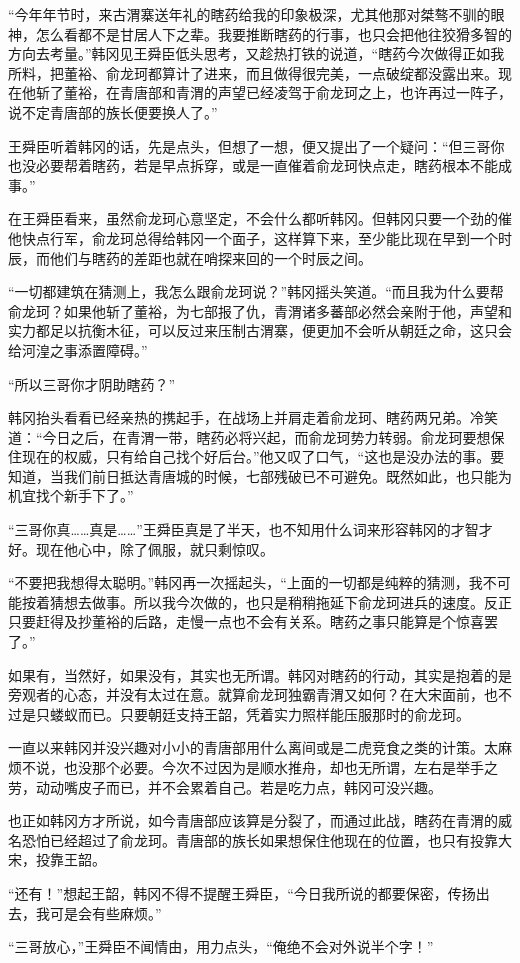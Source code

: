 “今年年节时，来古渭寨送年礼的瞎药给我的印象极深，尤其他那对桀骜不驯的眼神，怎么看都不是甘居人下之辈。我要推断瞎药的行事，也只会把他往狡猾多智的方向去考量。”韩冈见王舜臣低头思考，又趁热打铁的说道，“瞎药今次做得正如我所料，把董裕、俞龙珂都算计了进来，而且做得很完美，一点破绽都没露出来。现在他斩了董裕，在青唐部和青渭的声望已经凌驾于俞龙珂之上，也许再过一阵子，说不定青唐部的族长便要换人了。”

王舜臣听着韩冈的话，先是点头，但想了一想，便又提出了一个疑问：“但三哥你也没必要帮着瞎药，若是早点拆穿，或是一直催着俞龙珂快点走，瞎药根本不能成事。”

在王舜臣看来，虽然俞龙珂心意坚定，不会什么都听韩冈。但韩冈只要一个劲的催他快点行军，俞龙珂总得给韩冈一个面子，这样算下来，至少能比现在早到一个时辰，而他们与瞎药的差距也就在哨探来回的一个时辰之间。

“一切都建筑在猜测上，我怎么跟俞龙珂说？”韩冈摇头笑道。“而且我为什么要帮俞龙珂？如果他斩了董裕，为七部报了仇，青渭诸多蕃部必然会亲附于他，声望和实力都足以抗衡木征，可以反过来压制古渭寨，便更加不会听从朝廷之命，这只会给河湟之事添置障碍。”

“所以三哥你才阴助瞎药？”

韩冈抬头看看已经亲热的携起手，在战场上并肩走着俞龙珂、瞎药两兄弟。冷笑道：“今日之后，在青渭一带，瞎药必将兴起，而俞龙珂势力转弱。俞龙珂要想保住现在的权威，只有给自己找个好后台。”他又叹了口气，“这也是没办法的事。要知道，当我们前日抵达青唐城的时候，七部残破已不可避免。既然如此，也只能为机宜找个新手下了。”

“三哥你真……真是……”王舜臣真是了半天，也不知用什么词来形容韩冈的才智才好。现在他心中，除了佩服，就只剩惊叹。

“不要把我想得太聪明。”韩冈再一次摇起头，“上面的一切都是纯粹的猜测，我不可能按着猜想去做事。所以我今次做的，也只是稍稍拖延下俞龙珂进兵的速度。反正只要赶得及抄董裕的后路，走慢一点也不会有关系。瞎药之事只能算是个惊喜罢了。”

如果有，当然好，如果没有，其实也无所谓。韩冈对瞎药的行动，其实是抱着的是旁观者的心态，并没有太过在意。就算俞龙珂独霸青渭又如何？在大宋面前，也不过是只蝼蚁而已。只要朝廷支持王韶，凭着实力照样能压服那时的俞龙珂。

一直以来韩冈并没兴趣对小小的青唐部用什么离间或是二虎竞食之类的计策。太麻烦不说，也没那个必要。今次不过因为是顺水推舟，却也无所谓，左右是举手之劳，动动嘴皮子而已，并不会累着自己。若是吃力点，韩冈可没兴趣。

也正如韩冈方才所说，如今青唐部应该算是分裂了，而通过此战，瞎药在青渭的威名恐怕已经超过了俞龙珂。青唐部的族长如果想保住他现在的位置，也只有投靠大宋，投靠王韶。

“还有！”想起王韶，韩冈不得不提醒王舜臣，“今日我所说的都要保密，传扬出去，我可是会有些麻烦。”

“三哥放心，”王舜臣不闻情由，用力点头，“俺绝不会对外说半个字！”

